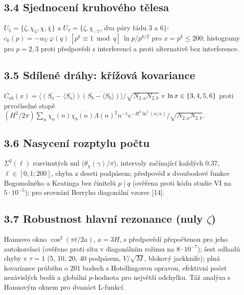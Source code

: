 \documentclass[
  10pt,
]{article}
\begin{document}
\hypertarget{sjednocenuxed-kruhovuxe9ho-tux11blesa}{%
\subsection{3.4 Sjednocení kruhového
tělesa}\label{sjednocenuxed-kruhovuxe9ho-tux11blesa}}

\(U_5 = \{\zeta, \chi_5, \chi, \bar\chi\}\) a
\(U_7 = \{\zeta, \chi_{-7}\), dva páry řádu 3 a 6\(\}\):
\(c_k(p) = -w_U\,\varphi(q)\,[p^k \equiv 1 \bmod q]\,\ln p/p^{k/2}\) pro
\(x = p^k \le 200\); histogramy pro \(p = 2, 3\) proti předpovědi s
interferencí a proti alternativě bez interference.

\hypertarget{sduxedlenuxe9-druxe1hy-kux159uxedux17eovuxe1-kovariance}{%
\subsection{3.5 Sdílené dráhy: křížová
kovariance}\label{sduxedlenuxe9-druxe1hy-kux159uxedux17eovuxe1-kovariance}}

\(C_{ab}(x) = \langle (S_a - \langle S_a\rangle)\overline{(S_b - \langle S_b\rangle)}\rangle/\sqrt{N_{2,a}N_{2,b}}\)
v \(\ln x \in \{3,\penalty300 4,\penalty300 5,\penalty300 6\}\) proti prvočíselné stopě
\((H^2/2\pi)\sum_n \chi_a(n)\overline{\chi_b(n)}\Lambda(n)^2 n^{-1}e^{-H^2\ln^2(n/x)}/\sqrt{N_{2,a}N_{2,b}}\).

\hypertarget{nasycenuxed-rozptylu-poux10dtu}{%
\subsection{3.6 Nasycení rozptylu
počtu}\label{nasycenuxed-rozptylu-poux10dtu}}

\(\Sigma^2(\ell)\) rozvinutých nul (\(\theta_\chi(\gamma)/\pi\)),
intervaly začínající každých 0,37, \(\ell \in [0{,}1; 200]\), chyba z
deseti podpásem; předpověď z dvoubodové funkce Bogomolného a Keatinga
bez činitelů \(p \mid q\) (ověřena proti kódu studie VI na
\(5\cdot10^{-5}\)); pro srovnání Berryho diagonální vzorec {[}14{]}.

\hypertarget{robustnost-hlavnuxed-rezonance-nuly-zeta}{%
\subsection{\texorpdfstring{3.7 Robustnost hlavní rezonance (nuly
\(\zeta\))}{3.7 Robustnost hlavní rezonance (nuly \textbackslash zeta)}}\label{robustnost-hlavnuxed-rezonance-nuly-zeta}}

Hannovo okno \(\cos^2(\pi t/2a)\), \(a = 3H\), s předpovědí přepočtenou
pro jeho autokorelaci (ověřeno proti sítu v diagonálním režimu na
\(8\cdot10^{-7}\)); šest odhadů chyby v \(\tau = 1\) (5, 10, 20, 40
podpásem, \(V/\sqrt M\), blokový jackknife); plná kovariance průběhu o
201 bodech s Hotellingovou opravou, efektivní počet nezávislých bodů a
globální \(p\)-hodnota pro největší odchylku. Táž analýza s Hannovým
oknem pro dvanáct L-funkcí.
\end{document}
